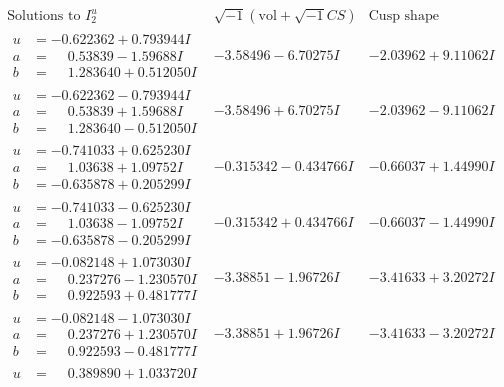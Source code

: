 \documentclass[1p]{elsarticle_modified}
\theoremstyle{definition}
\newcommand{\I}{\sqrt{-1}}
\begin{document}
$$\begin{array}{c|c|c}  
\text{Solutions to }I^u_{2}& \I (\text{vol} + \sqrt{-1}CS) & \text{Cusp shape}\\
 \hline 
\begin{aligned}
u &= -0.622362 + 0.793944 I \\
a &= \phantom{-}0.53839 - 1.59688 I \\
b &= \phantom{-}1.283640 + 0.512050 I\end{aligned}
 & -3.58496 - 6.70275 I & -2.03962 + 9.11062 I \\ \hline\begin{aligned}
u &= -0.622362 - 0.793944 I \\
a &= \phantom{-}0.53839 + 1.59688 I \\
b &= \phantom{-}1.283640 - 0.512050 I\end{aligned}
 & -3.58496 + 6.70275 I & -2.03962 - 9.11062 I \\ \hline\begin{aligned}
u &= -0.741033 + 0.625230 I \\
a &= \phantom{-}1.03638 + 1.09752 I \\
b &= -0.635878 + 0.205299 I\end{aligned}
 & -0.315342 - 0.434766 I & -0.66037 + 1.44990 I \\ \hline\begin{aligned}
u &= -0.741033 - 0.625230 I \\
a &= \phantom{-}1.03638 - 1.09752 I \\
b &= -0.635878 - 0.205299 I\end{aligned}
 & -0.315342 + 0.434766 I & -0.66037 - 1.44990 I \\ \hline\begin{aligned}
u &= -0.082148 + 1.073030 I \\
a &= \phantom{-}0.237276 - 1.230570 I \\
b &= \phantom{-}0.922593 + 0.481777 I\end{aligned}
 & -3.38851 - 1.96726 I & -3.41633 + 3.20272 I \\ \hline\begin{aligned}
u &= -0.082148 - 1.073030 I \\
a &= \phantom{-}0.237276 + 1.230570 I \\
b &= \phantom{-}0.922593 - 0.481777 I\end{aligned}
 & -3.38851 + 1.96726 I & -3.41633 - 3.20272 I \\ \hline\begin{aligned}
u &= \phantom{-}0.389890 + 1.033720 I \\

\end{aligned}
\end{array}$$
\end{document}
